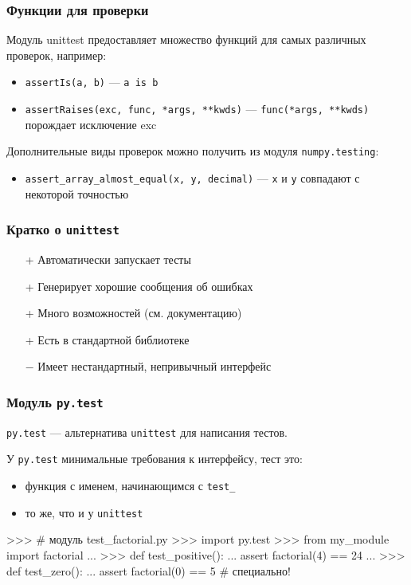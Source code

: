 \documentclass[fleqn, xcolor=x11names]{beamer}
\begin{document}
\begin{frame}[fragile]\frametitle{Функции для проверки}
Модуль unittest предоставляет множество функций для самых различных проверок, например:
\begin{itemize}
\item \texttt{assertIs(a, b)} --- \texttt{a is b}

\item \texttt{assertRaises(exc, func, *args, **kwds)} --- \texttt{func(*args, **kwds)} порождает исключение exc

\end{itemize}

\hfill

Дополнительные виды проверок можно получить из модуля \texttt{numpy.testing}:

\begin{itemize}

\item \texttt{assert_array_almost_equal(x, y, decimal)} --- \texttt{x} и \texttt{y} совпадают с некоторой точностью
\end{itemize}
\end{frame}

\begin{frame}[fragile]\frametitle{Кратко о \texttt{unittest}}
\begin{itemize}
\item[+] Автоматически запускает тесты

\item[+] Генерирует хорошие сообщения об ошибках

\item[+] Много возможностей (см. документацию)

\item[+] Есть в стандартной библиотеке

\item[$-$] Имеет нестандартный, непривычный интерфейс
\end{itemize}
\end{frame}

\begin{frame}[fragile]\frametitle{Модуль \texttt{py.test}}
\texttt{py.test} --- альтернатива \texttt{unittest} для написания тестов.

\hfill

У \texttt{py.test} минимальные требования к интерфейсу, тест это:

\begin{itemize}
\item функция с именем, начинающимся с \texttt{test\_}
\item то же, что и у \texttt{unittest}
\end{itemize}

\begin{pcode}
>>> # модуль test_factorial.py
>>> import py.test
>>> from my_module import factorial
...
>>> def test_positive(): 
...    assert factorial(4) == 24
...
>>> def test_zero():
...    assert factorial(0) == 5 # специально!
\end{pcode}

\end{frame}
\end{document}
